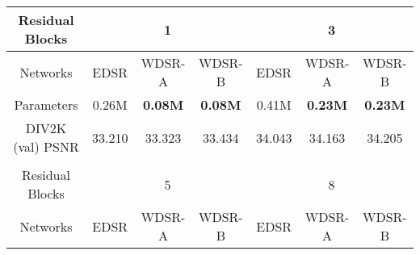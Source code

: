 \documentclass{article}
\begin{document}
\begin{table}[]
\centering
\begin{tabular}{ccccccc}
\hline
\multicolumn{1}{|c|}{Residual Blocks}  & \multicolumn{3}{c|}{1}                                                                                                                              & \multicolumn{3}{c|}{3}                                                                                                                              \\ \hline
\multicolumn{1}{|c|}{Networks}         & \multicolumn{1}{c|}{EDSR}   & \multicolumn{1}{c|}{WDSR-A}                               & \multicolumn{1}{c|}{WDSR-B}                               & \multicolumn{1}{c|}{EDSR}   & \multicolumn{1}{c|}{WDSR-A}                               & \multicolumn{1}{c|}{WDSR-B}                               \\ \hline
\multicolumn{1}{|c|}{Parameters}       & \multicolumn{1}{c|}{0.26M}   & \multicolumn{1}{c|}{{\color[HTML]{333333} \textbf{0.08M}}} & \multicolumn{1}{c|}{{\color[HTML]{333333} \textbf{0.08M}}} & \multicolumn{1}{c|}{0.41M}   & \multicolumn{1}{c|}{{\color[HTML]{333333} \textbf{0.23M}}} & \multicolumn{1}{c|}{{\color[HTML]{333333} \textbf{0.23M}}} \\ \hline
\multicolumn{1}{|c|}{DIV2K (val) PSNR} & \multicolumn{1}{c|}{33.210} & \multicolumn{1}{c|}{{\color[HTML]{0000FF} 33.323}}        & \multicolumn{1}{c|}{{\color[HTML]{FF0000} 33.434}}        & \multicolumn{1}{c|}{34.043} & \multicolumn{1}{c|}{{\color[HTML]{0000FF} 34.163}}        & \multicolumn{1}{c|}{{\color[HTML]{FF0000} 34.205}}        \\ \hline
                                       &                             &                                                           &                                                           &                             &                                                           &                                                           \\ \hline
\multicolumn{1}{|c|}{Residual Blocks}  & \multicolumn{3}{c|}{5}                                                                                                                              & \multicolumn{3}{c|}{8}                                                                                                                              \\ \hline
\multicolumn{1}{|c|}{Networks}         & \multicolumn{1}{c|}{EDSR}   & \multicolumn{1}{c|}{WDSR-A}                               & \multicolumn{1}{c|}{WDSR-B}                               & \multicolumn{1}{c|}{EDSR}   & \multicolumn{1}{c|}{WDSR-A}                               & \multicolumn{1}{c|}{WDSR-B}                               \\ \hline

\end{tabular}
\end{table}
\end{document}
